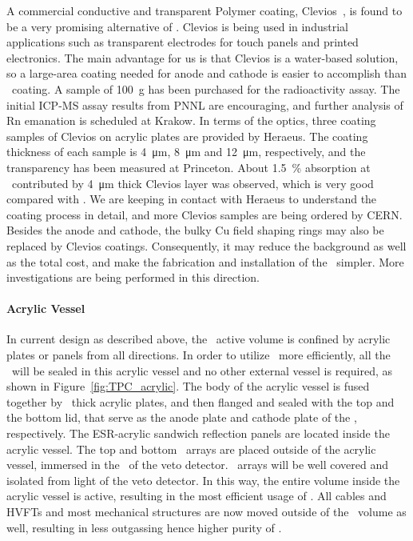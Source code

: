 A commercial conductive and transparent Polymer coating, Clevios~\cite{Clevios}, is found to be a very promising alternative of \ITO. Clevios is being used in industrial applications such as transparent electrodes for touch panels and printed electronics. The main advantage for us is that Clevios is a water-based solution, so a large-area coating needed for anode and cathode is easier to accomplish than \ITO\ coating.
A sample of \SI{100}{\gram} has been purchased for the radioactivity assay. The initial ICP-MS assay results from PNNL are encouraging, and further analysis of Rn emanation is scheduled at Krakow. In terms of the optics, three coating samples of Clevios on acrylic plates are provided by Heraeus. The coating thickness of each sample is \SI{4}{\um}, \SI{8}{\um} and \SI{12}{\um}, respectively, and the transparency has been measured at Princeton. About \SI{1.5}{\percent} absorption at \DSfPMTWaveLength\ contributed by \SI{4}{\um} thick Clevios layer was observed, which is very good compared with \ITO. We are keeping in contact with Heraeus to understand the coating process in detail, and more Clevios samples are being ordered by CERN. Besides the anode and cathode, the bulky Cu field shaping rings may also be replaced by Clevios coatings.
Consequently, it may reduce the background as well as the total cost, and make the fabrication and installation of the \TPC\ simpler. More investigations are being performed in this direction.


\paragraph{Acrylic Vessel}

In current design as described above, the \TPC\ active volume is confined by acrylic plates or panels from all directions. In order to utilize \UAr\ more efficiently, all the \UAr\ will be sealed in this acrylic vessel and no other external vessel is required, as shown in Figure~\ref{fig:TPC_acrylic}. 
The body of the acrylic vessel is fused together by \DSkPMMATPCThickness\ thick acrylic plates, and then flanged and sealed with the 
 top and the bottom lid, that  serve as the anode plate and cathode plate of the \TPC, respectively. 
The ESR-acrylic sandwich reflection panels are located inside the acrylic vessel. The top and bottom \DSkPdm\ arrays are placed outside of the acrylic vessel, immersed in the \AAr\ of the veto detector. \DSkPdm\ arrays will be well covered and isolated from light of the veto detector.
In this way, 
the entire volume inside the acrylic vessel  is active, resulting in the most efficient usage of \UAr. All cables and HVFTs and most mechanical structures are now moved outside of the \UAr\ volume as well, resulting in less outgassing hence higher purity of \UAr. 

